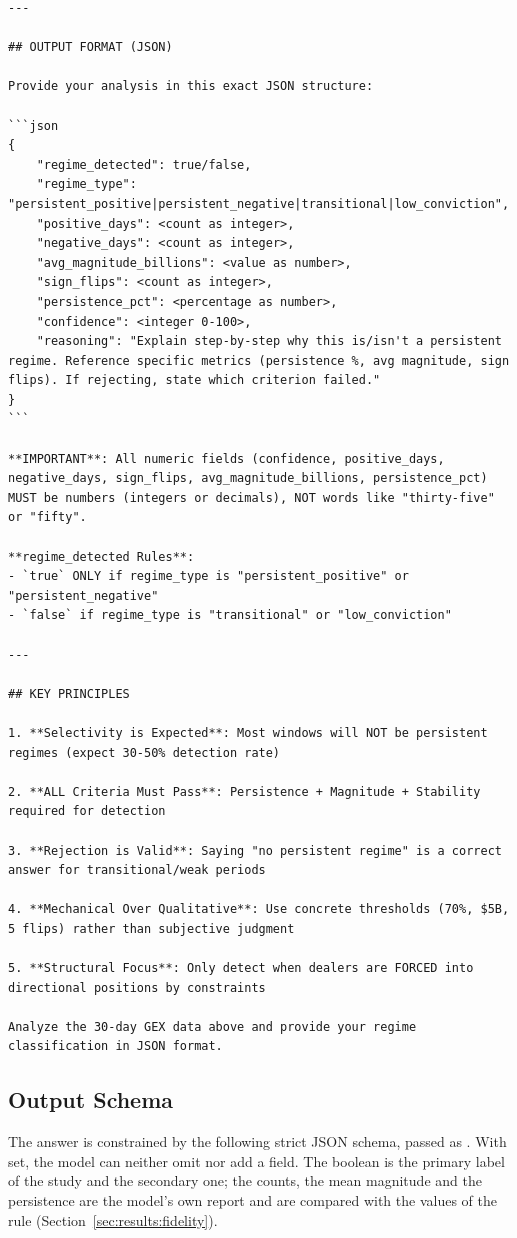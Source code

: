 \begin{lstlisting}[style=prompt]
---

## OUTPUT FORMAT (JSON)

Provide your analysis in this exact JSON structure:

```json
{
    "regime_detected": true/false,
    "regime_type": "persistent_positive|persistent_negative|transitional|low_conviction",
    "positive_days": <count as integer>,
    "negative_days": <count as integer>,
    "avg_magnitude_billions": <value as number>,
    "sign_flips": <count as integer>,
    "persistence_pct": <percentage as number>,
    "confidence": <integer 0-100>,
    "reasoning": "Explain step-by-step why this is/isn't a persistent regime. Reference specific metrics (persistence %, avg magnitude, sign flips). If rejecting, state which criterion failed."
}
```

**IMPORTANT**: All numeric fields (confidence, positive_days, negative_days, sign_flips, avg_magnitude_billions, persistence_pct) MUST be numbers (integers or decimals), NOT words like "thirty-five" or "fifty".

**regime_detected Rules**:
- `true` ONLY if regime_type is "persistent_positive" or "persistent_negative"
- `false` if regime_type is "transitional" or "low_conviction"

---

## KEY PRINCIPLES

1. **Selectivity is Expected**: Most windows will NOT be persistent regimes (expect 30-50% detection rate)

2. **ALL Criteria Must Pass**: Persistence + Magnitude + Stability required for detection

3. **Rejection is Valid**: Saying "no persistent regime" is a correct answer for transitional/weak periods

4. **Mechanical Over Qualitative**: Use concrete thresholds (70%, $5B, 5 flips) rather than subjective judgment

5. **Structural Focus**: Only detect when dealers are FORCED into directional positions by constraints

Analyze the 30-day GEX data above and provide your regime classification in JSON format.
\end{lstlisting}

\subsection{Output Schema}
\label{app:prompt:schema}

The answer is constrained by the following strict JSON schema, passed as . With  set, the model can neither omit nor add a field. The boolean  is the primary label of the study and  the secondary one; the counts, the mean magnitude and the persistence are the model's own report and are compared with the values of the rule (Section~\ref{sec:results:fidelity}).

